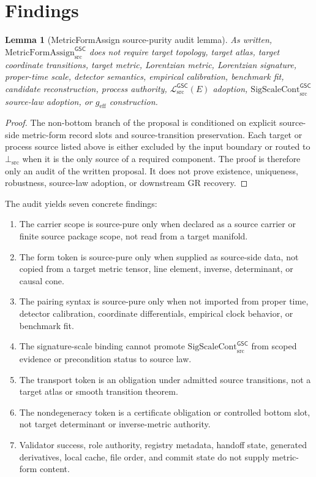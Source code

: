 \documentclass[11pt]{article}
\newcommand{\MetricData}{\mathcal{L}_{\mathrm{src}}^{\mathsf{GSC}}}
\newcommand{\geff}{g_{\mathrm{eff}}}
\newcommand{\SigScaleCont}{\mathrm{SigScaleCont}_{\mathrm{src}}^{\mathsf{GSC}}}
\newcommand{\MetricFormAssign}{\mathrm{MetricFormAssign}_{\mathrm{src}}^{\mathsf{GSC}}}
\newcommand{\BottomSrc}{\bot_{\mathrm{src}}}
\newtheorem{lemma}{Lemma}
\begin{document}
\section{Findings}

\begin{lemma}[MetricFormAssign source-purity audit lemma]
As written, \(\MetricFormAssign\) does not require target topology, target
atlas, target coordinate transitions, target metric, Lorentzian metric,
Lorentzian signature, proper-time scale, detector semantics, empirical
calibration, benchmark fit, candidate reconstruction, process authority,
\(\MetricData(E)\) adoption, \(\SigScaleCont\) source-law adoption, or
\(\geff\) construction.
\end{lemma}

\begin{proof}
The non-bottom branch of the proposal is conditioned on explicit source-side
metric-form record slots and source-transition preservation. Each target or
process source listed above is either excluded by the input boundary or routed
to \(\BottomSrc\) when it is the only source of a required component. The
proof is therefore only an audit of the written proposal. It does not prove
existence, uniqueness, robustness, source-law adoption, or downstream GR
recovery.
\end{proof}

The audit yields seven concrete findings:
\begin{enumerate}[leftmargin=*]
  \item The carrier scope is source-pure only when declared as a source
  carrier or finite source package scope, not read from a target manifold.
  \item The form token is source-pure only when supplied as source-side data,
  not copied from a target metric tensor, line element, inverse, determinant,
  or causal cone.
  \item The pairing syntax is source-pure only when not imported from proper
  time, detector calibration, coordinate differentials, empirical clock
  behavior, or benchmark fit.
  \item The signature-scale binding cannot promote \(\SigScaleCont\) from
  scoped evidence or precondition status to source law.
  \item The transport token is an obligation under admitted source
  transitions, not a target atlas or smooth transition theorem.
  \item The nondegeneracy token is a certificate obligation or controlled
  bottom slot, not target determinant or inverse-metric authority.
  \item Validator success, role authority, registry metadata, handoff state,
  generated derivatives, local cache, file order, and commit state do not
  supply metric-form content.
\end{enumerate}
\end{document}
